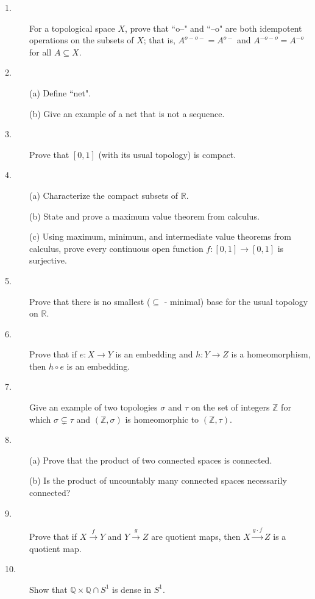 \documentclass{article}
\def\R{\mathbb R}
\def\Z{\mathbb Z}
\def\Q{\mathbb Q}
\begin{document}
\begin{description}
\item[1.]
For a topological space $X$, prove that ``o--" and ``--o" are both idempotent
operations on the subsets of $X$; that is, $A^{o-o-} = A^{o-}$ and
$A^{-o-o} = A^{-o}$ for all $A \subseteq X$.

\item[2.] (a)
Define ``net".

\item[\quad] (b)
Give an example of a net that is not a sequence.

\item[3.]
Prove that $[0,1]$ (with its usual topology) is compact.

\item[4.] (a)
Characterize the compact subsets of $\R$.

\item[\quad] (b)
State and prove a maximum value theorem from calculus.

\item[\quad] (c)
Using maximum, minimum, and intermediate value theorems from calculus, prove
every continuous open function $f: [0,1] \to [0,1]$ is surjective.

\item[5.]
Prove that there is no smallest ($\subseteq$ - minimal) base for the usual
topology on $\R$.

\item[6.]
Prove that if $e: X \to Y$ is an embedding and $h: Y \to Z$ is a homeomorphism,
then $h \circ e$ is an embedding.

\item[7.]
Give an example of two topologies $\sigma$ and $\tau$ on the set of integers
$\Z$ for which $\sigma \subsetneq \tau$ and $(\Z, \sigma)$ is
homeomorphic to $(\Z, \tau)$.

\item[8.] (a)
Prove that the product of two connected spaces is connected.

\item[\quad] (b)
Is the product of uncountably many connected spaces necessarily connected?

\item[9.]
Prove that if $X \stackrel{f}{\longrightarrow} Y$ and
$Y \stackrel{g}{\longrightarrow} Z$ are quotient maps, then
$X \stackrel{g \cdot f}{\longrightarrow} Z$ is a quotient map.

\item[10.]
Show that $\Q \times \Q \cap S^1$ is dense in $S^1$.


\end{description}
\end{document}
